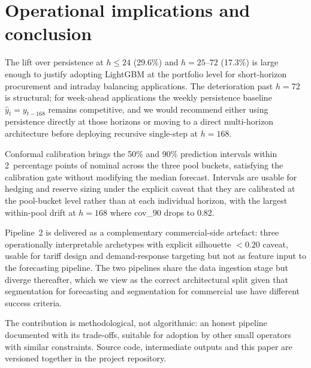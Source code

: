 \documentclass[11pt]{article}
\begin{document}
\section{Operational implications and conclusion}

The lift over persistence at $h \leq 24$ (29.6\%) and $h = 25$--$72$
(17.3\%) is large enough to justify adopting LightGBM at the portfolio
level for short-horizon procurement and intraday balancing applications.
The deterioration past $h = 72$ is structural; for week-ahead applications
the weekly persistence baseline $\hat{y}_t = y_{t-168}$ remains
competitive, and we would recommend either using persistence directly at
those horizons or moving to a direct multi-horizon architecture before
deploying recursive single-step at $h = 168$.

Conformal calibration brings the 50\% and 90\% prediction intervals
within 2~percentage points of nominal across the three pool buckets,
satisfying the calibration gate without modifying the median forecast.
Intervals are usable for hedging and reserve sizing under the explicit
caveat that they are calibrated at the pool-bucket level rather than at
each individual horizon, with the largest within-pool drift at $h = 168$
where cov\_90 drops to 0.82.

Pipeline~2 is delivered as a complementary commercial-side artefact: three
operationally interpretable archetypes with explicit silhouette
$< 0.20$ caveat, usable for tariff design and demand-response targeting
but not as feature input to the forecasting pipeline. The two pipelines
share the data ingestion stage but diverge thereafter, which we view as
the correct architectural split given that segmentation for forecasting
and segmentation for commercial use have different success criteria.

The contribution is methodological, not algorithmic: an honest pipeline
documented with its trade-offs, suitable for adoption by other small
operators with similar constraints. Source code, intermediate outputs and
this paper are versioned together in the project repository.



\end{document}
